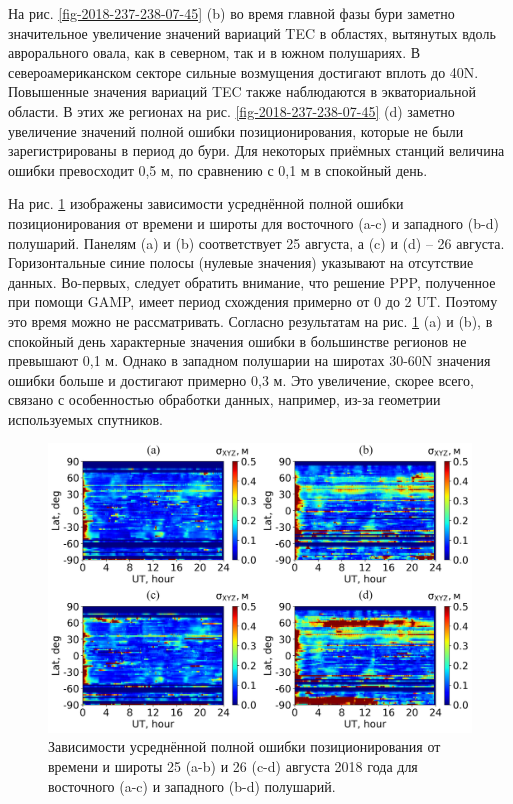 На рис. \ref{fig-2018-237-238-07-45} (b) во время главной фазы бури заметно значительное увеличение значений вариаций TEC в областях, вытянутых вдоль аврорального овала, как в северном, так и в южном полушариях.
В североамериканском секторе сильные возмущения достигают вплоть до 40\degree N.
Повышенные значения вариаций TEC также наблюдаются в экваториальной области.
В этих же регионах на рис. \ref{fig-2018-237-238-07-45} (d) заметно увеличение значений полной ошибки позиционирования, которые не были зарегистрированы в период до бури.
Для некоторых приёмных станций величина ошибки превосходит 0,5 м, по сравнению с 0,1 м в спокойный день. 

На рис. \ref{fig-2018-237-238} изображены зависимости усреднённой полной ошибки позиционирования от времени и широты для восточного (a-c) и западного (b-d) полушарий.
Панелям (a) и (b) соответствует 25 августа, а (c) и (d) -- 26 августа.
Горизонтальные синие полосы (нулевые значения) указывают на отсутствие данных.
Во-первых, следует обратить внимание, что решение PPP, полученное при помощи GAMP, имеет период схождения примерно от 0 до 2 UT.
Поэтому это время можно не рассматривать.
Согласно результатам на рис. \ref{fig-2018-237-238} (a) и (b), в спокойный день характерные значения ошибки в большинстве регионов не превышают 0,1 м.
Однако в западном полушарии на широтах 30-60\degree N значения ошибки больше и достигают примерно 0,3 м.
Это увеличение, скорее всего, связано с особенностью обработки данных, например, из-за геометрии используемых спутников. 
\begin{figure}[h]
\includegraphics[width=\textwidth]{fig/2018-237-238.png}    
\caption{Зависимости усреднённой полной ошибки позиционирования от времени и широты 25 (a-b) и 26 (c-d) августа 2018 года для восточного (a-c) и западного (b-d) полушарий.} 
\label{fig-2018-237-238}      
\end{figure} 

